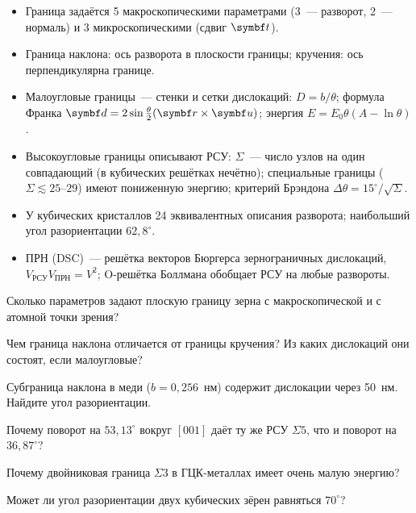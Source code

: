 \begin{itogi}
\begin{itemize}
\item Граница задаётся 5 макроскопическими параметрами (3~— разворот, 2~—
нормаль) и 3 микроскопическими (сдвиг $\vb t$).
\item Граница наклона: ось разворота в плоскости границы; кручения:
ось перпендикулярна границе.
\item Малоугловые границы~— стенки и сетки дислокаций: $D=b/\theta$;
формула Франка $\vb d=2\sin\frac\theta2(\vb r\times\vb u)$; энергия
$E=E_0\theta(A-\ln\theta)$.
\item Высокоугловые границы описывают РСУ: $\Sigma$~— число узлов на один
совпадающий (в кубических решётках нечётно); специальные границы
($\Sigma\lesssim25$--$29$) имеют пониженную энергию; критерий Брэндона
$\Delta\theta=15^\circ/\sqrt\Sigma$.
\item У кубических кристаллов 24 эквивалентных описания разворота;
наибольший угол разориентации $62{,}8^\circ$.
\item ПРН (DSC)~— решётка векторов Бюргерса зернограничных дислокаций,
$V_\text{РСУ}V_\text{ПРН}=V^2$; O-решётка Боллмана обобщает РСУ на любые
развороты.
\end{itemize}
\end{itogi}

\enlargethispage{2\baselineskip}
\begin{proverka}
\item Сколько параметров задают плоскую границу зерна с макроскопической
и с атомной точки зрения?
\item Чем граница наклона отличается от границы кручения? Из каких
дислокаций они состоят, если малоугловые?
\item Субграница наклона в меди ($b=0{,}256$~нм) содержит дислокации через
50~нм. Найдите угол разориентации.
\item Почему поворот на $53{,}13^\circ$ вокруг $[001]$ даёт ту же РСУ $\Sigma5$,
что и поворот на $36{,}87^\circ$?
\item Почему двойниковая граница $\Sigma3$ в ГЦК-металлах имеет очень
малую энергию?
\item Может ли угол разориентации двух кубических зёрен равняться
$70^\circ$?
\end{proverka}

